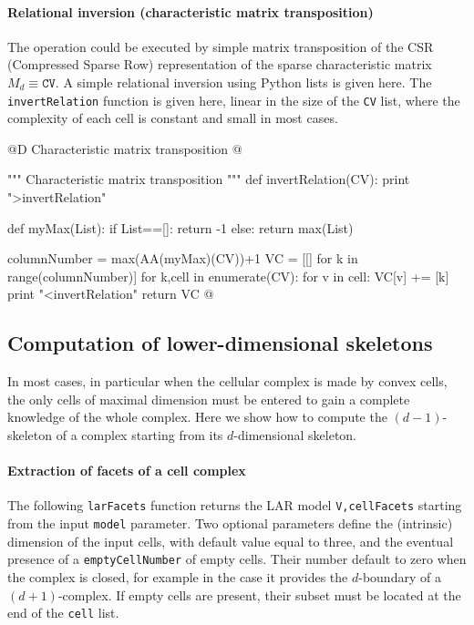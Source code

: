 \documentclass[11pt,oneside]{article}	%
\begin{document}
\paragraph{Relational inversion (characteristic matrix transposition)}

The operation could be executed by simple matrix transposition of the CSR (Compressed Sparse Row) representation of the sparse characteristic matrix $M_d \equiv \texttt{CV}$.
A simple relational inversion using Python lists is given here. The \texttt{invertRelation} function 
is given here, linear in the size of the \texttt{CV} list, where the complexity of each cell is constant and 
small in most cases.

@D Characteristic matrix transposition
@{""" Characteristic matrix transposition """
def invertRelation(CV):
    print ">invertRelation"
    
    def myMax(List):
        if List==[]:  return -1
        else:  return max(List)
            
    columnNumber = max(AA(myMax)(CV))+1
    VC = [[] for k in range(columnNumber)]
    for k,cell in enumerate(CV):
        for v in cell: VC[v] += [k]
    print "<invertRelation"
    return VC
@}


\subsection{Computation of lower-dimensional skeletons}

In most cases, in particular when the cellular complex is made by convex cells, the only cells of maximal dimension must be entered to gain a complete knowledge of the whole complex.
Here we show how to compute the $(d-1)$-skeleton of a complex starting from its $d$-dimensional skeleton.

\paragraph{Extraction of facets of a cell complex} 

The following \texttt{larFacets} function returns the LAR model \texttt{V,cellFacets} starting from the input \texttt{model} parameter. Two optional parameters define the (intrinsic) dimension of the input cells, with default value equal to three, and the eventual presence of a \texttt{emptyCellNumber} of empty cells. Their number default to zero when the complex is closed, for example in the case it provides the $d$-boundary of a $(d+1)$-complex. If empty cells are present, their subset must be located at the end of the \texttt{cell} list.
\end{document}
